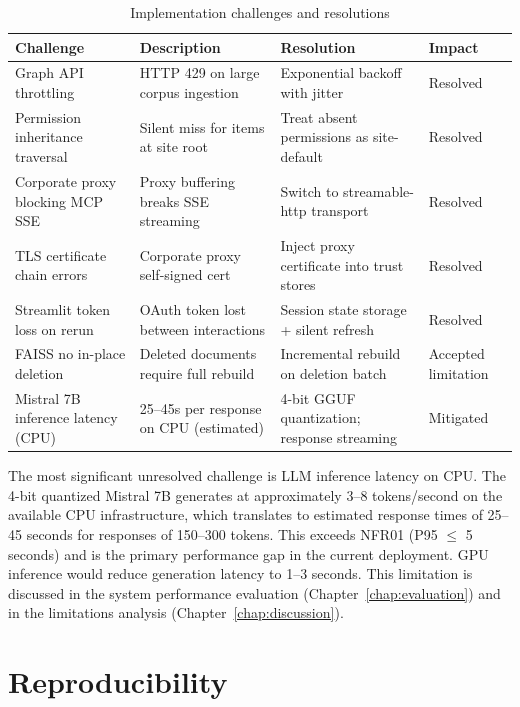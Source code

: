 \begin{table}[H]
\centering
\caption{Implementation challenges and resolutions}
\label{tab:impl-challenges}
\begin{tabularx}{\textwidth}{@{}lXXl@{}}
\toprule
\textbf{Challenge} & \textbf{Description} & \textbf{Resolution} & \textbf{Impact} \\
\midrule
Graph API throttling & HTTP 429 on large corpus ingestion & Exponential backoff with jitter & Resolved \\
Permission inheritance traversal & Silent miss for items at site root & Treat absent permissions as site-default & Resolved \\
Corporate proxy blocking MCP SSE & Proxy buffering breaks SSE streaming & Switch to streamable-http transport & Resolved \\
TLS certificate chain errors & Corporate proxy self-signed cert & Inject proxy certificate into trust stores & Resolved \\
Streamlit token loss on rerun & OAuth token lost between interactions & Session state storage + silent refresh & Resolved \\
FAISS no in-place deletion & Deleted documents require full rebuild & Incremental rebuild on deletion batch & Accepted limitation \\
Mistral 7B inference latency (CPU) & 25--45s per response on CPU (estimated) & 4-bit GGUF quantization; response streaming & Mitigated \\
\bottomrule
\end{tabularx}
\end{table}

The most significant unresolved challenge is LLM inference latency on CPU. The 4-bit quantized Mistral 7B generates at approximately 3--8 tokens/second on the available CPU infrastructure, which translates to estimated response times of 25--45 seconds for responses of 150--300 tokens. This exceeds NFR01 (P95 $\leq$ 5 seconds) and is the primary performance gap in the current deployment. GPU inference would reduce generation latency to 1--3 seconds. This limitation is discussed in the system performance evaluation (Chapter~\ref{chap:evaluation}) and in the limitations analysis (Chapter~\ref{chap:discussion}).

\section{Reproducibility}
\label{sec:impl-reproducibility}


